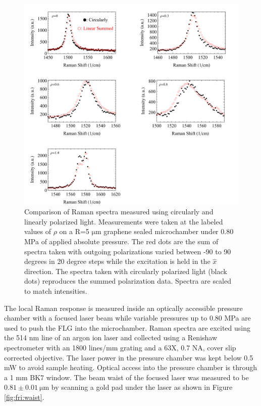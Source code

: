\begin{figure}
	\begin{center}
	\includegraphics[scale=.75]{Figs_Friction/LinearvsCircular.pdf}
	\end{center}
	\caption[Comparison of Raman spectra measured using circularly and linearly polarized light]{\label{fig:fri:circlelinear}Comparison of Raman spectra measured using circularly and linearly polarized light.
	Measurements were taken at the labeled values of $\rho$ on a R=5 $\mathrm{\mu}$m graphene sealed microchamber under 0.80 MPa of applied absolute pressure.
	The red dots are the sum of spectra taken with outgoing polarizations varied between -90 to 90 degrees in 20 degree steps while the excitation is held in the $\hat x$ direction.
	The spectra taken with circularly polarized light (black dots) reproduces the summed polarization data.
	Spectra are scaled to match intensities.
	}
\end{figure}

The local Raman response is measured inside an optically accessible pressure chamber with a focused laser beam while variable pressures up to 0.80 MPa are used to push the FLG into the microchamber.
Raman spectra are excited using the 514 nm line of an argon ion laser and collected using a Renishaw spectrometer with an 1800 lines/mm grating and a 63X, 0.7 NA, cover slip corrected objective.
The laser power in the pressure chamber was kept below 0.5 mW to avoid sample heating.
Optical access into the pressure chamber is through a 1 mm BK7 window.
The beam waist of the focused laser was measured to be $0.81 \pm 0.01 \ \mathrm{\mu m}$ by scanning a gold pad under the laser as shown in Figure \ref{fig:fri:waist}.

